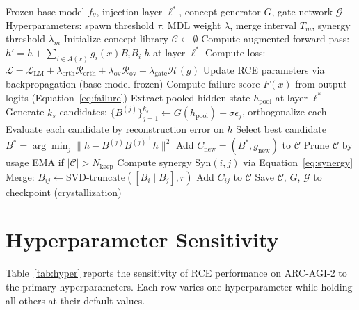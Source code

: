 \documentclass[11pt]{article}
\begin{document}
\begin{algorithm}[h]
\caption{Recursive Concept Evolution Training}
\label{alg:rce}
\begin{algorithmic}[1]
\REQUIRE Frozen base model $f_\theta$, injection layer $\ell^*$, concept generator $G$, gate network $\mathcal{G}$
\REQUIRE Hyperparameters: spawn threshold $\tau$, MDL weight $\lambda$, merge interval $T_m$, synergy threshold $\lambda_m$
\STATE Initialize concept library $\mathcal{C} \leftarrow \emptyset$
  \STATE Compute augmented forward pass: $h' = h + \sum_{i \in A(x)} g_i(x) B_i B_i^\top h$ at layer $\ell^*$
  \STATE Compute loss: $\mathcal{L} = \mathcal{L}_{\text{LM}} + \lambda_{\text{orth}} \mathcal{R}_{\text{orth}} + \lambda_{\text{ov}} \mathcal{R}_{\text{ov}} + \lambda_{\text{gate}} \mathcal{H}(g)$
  \STATE Update RCE parameters via backpropagation (base model frozen)
  \STATE Compute failure score $F(x)$ from output logits (Equation~\ref{eq:failure})
    \STATE Extract pooled hidden state $h_{\text{pool}}$ at layer $\ell^*$
    \STATE Generate $k_s$ candidates: $\{B^{(j)}\}_{j=1}^{k_s} \leftarrow G(h_{\text{pool}}) + \sigma\epsilon_j$, orthogonalize each
    \STATE Evaluate each candidate by reconstruction error on $h$
    \STATE Select best candidate $B^* = \arg\min_j \|h - B^{(j)} {B^{(j)}}^\top h\|^2$
      \STATE Add $C_{\text{new}} = (B^*, g_{\text{new}})$ to $\mathcal{C}$
      \STATE Prune $\mathcal{C}$ by usage EMA if $|\mathcal{C}| > N_{\text{keep}}$
    \ENDIF
  \ENDIF
      \STATE Compute synergy $\text{Syn}(i,j)$ via Equation~\ref{eq:synergy}
        \STATE Merge: $B_{ij} \leftarrow \text{SVD-truncate}([B_i \mid B_j], r)$
        \STATE Add $C_{ij}$ to $\mathcal{C}$
      \ENDIF
    \ENDFOR
  \ENDIF
\ENDFOR
\STATE Save $\mathcal{C}$, $G$, $\mathcal{G}$ to checkpoint (crystallization)
\end{algorithmic}
\end{algorithm}

\section{Hyperparameter Sensitivity}

Table~\ref{tab:hyper} reports the sensitivity of RCE performance on ARC-AGI-2 to the primary hyperparameters. Each row varies one hyperparameter while holding all others at their default values.
\end{document}
